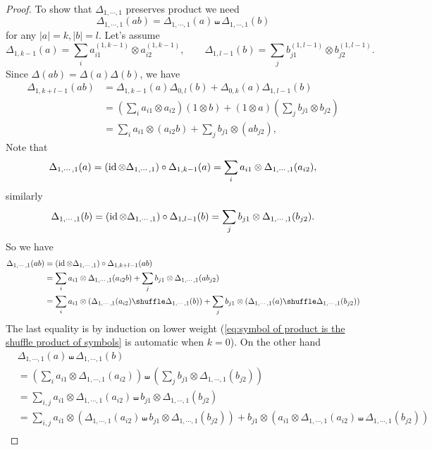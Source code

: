 \begin{proof}
To show that $\Delta_{1,\cdots,1}$ preserves product we need
\begin{equation}\label{eq:symbol of product is the shuffle product of symbols}
\Delta_{1,\cdots,1}(ab)=\Delta_{1,\cdots,1}(a)\shuffle\Delta_{1,\cdots,1}(b)
\end{equation}
for any $|a|=k,|b|=l$. Let's assume
\[
\Delta_{1,k-1}(a)=\sum_ia^{(1,k-1)}_{i1}\otimes a^{(1,k-1)}_{i2},\qquad \Delta_{1,l-1}(b)=\sum_jb^{(1,l-1)}_{j1}\otimes b^{(1,l-1)}_{j2}.
\]
Since $\Delta(ab)=\Delta(a)\Delta(b)$, we have
\begin{align*}
\Delta_{1,k+l-1}(ab)&=\Delta_{1,k-1}(a)\Delta_{0,l}(b)+\Delta_{0,k}(a)\Delta_{1,l-1}(b)\\
&=\left(\sum_ia_{i1}\otimes a_{i2}\right)(1\otimes b)+(1\otimes a)\left(\sum_jb_{j1}\otimes b_{j2}\right)\\
&=\sum_ia_{i1}\otimes(a_{i2}b)+\sum_jb_{j1}\otimes(ab_{j2}),
\end{align*}
Note that
\[
\Delta_{1,\cdots,1}(a)=(\operatorname{id}\otimes\Delta_{1,\cdots,1})\circ\Delta_{1,k-1}(a)=\sum_ia_{i1}\otimes\Delta_{1,\cdots,1}(a_{i2}),
\]
similarly
\[
\Delta_{1,\cdots,1}(b)=(\operatorname{id}\otimes\Delta_{1,\cdots,1})\circ\Delta_{1,l-1}(b)=\sum_jb_{j1}\otimes\Delta_{1,\cdots,1}(b_{j2}).
\]
So we have
\begin{align*}
\Delta_{1,\cdots,1}(ab)&=(\id\otimes\Delta_{1,\cdots,1})\circ\Delta_{1,k+l-1}(ab)\\
&=\sum_ia_{i1}\otimes\Delta_{1,\cdots,1}(a_{i2}b)+\sum_jb_{j1}\otimes\Delta_{1,\cdots,1}(ab_{j2})\\
&=\sum_ia_{i1}\otimes(\Delta_{1,\cdots,1}(a_{i2})\shuffle\Delta_{1,\cdots,1}(b))+\sum_jb_{j1}\otimes(\Delta_{1,\cdots,1}(a)\shuffle\Delta_{1,\cdots,1}(b_{j2}))
\end{align*}
The last equality is by induction on lower weight (\eqref{eq:symbol of product is the shuffle product of symbols} is automatic when $k=0$). On the other hand
\begin{align*}
&\Delta_{1,\cdots,1}(a)\shuffle\Delta_{1,\cdots,1}(b)\\
&=\left(\sum_ia_{i1}\otimes\Delta_{1,\cdots,1}(a_{i2})\right)\shuffle\left(\sum_jb_{j1}\otimes\Delta_{1,\cdots,1}(b_{j2})\right)\\
&=\sum_{i,j}a_{i1}\otimes\Delta_{1,\cdots,1}(a_{i2})\shuffle b_{j1}\otimes\Delta_{1,\cdots,1}(b_{j2})\\
&=\sum_{i,j}a_{i1}\otimes(\Delta_{1,\cdots,1}(a_{i2})\shuffle b_{j1}\otimes\Delta_{1,\cdots,1}(b_{j2}))+b_{j1}\otimes(a_{i1}\otimes\Delta_{1,\cdots,1}(a_{i2})\shuffle\Delta_{1,\cdots,1}(b_{j2}))\\

\end{align*}
\end{proof}
